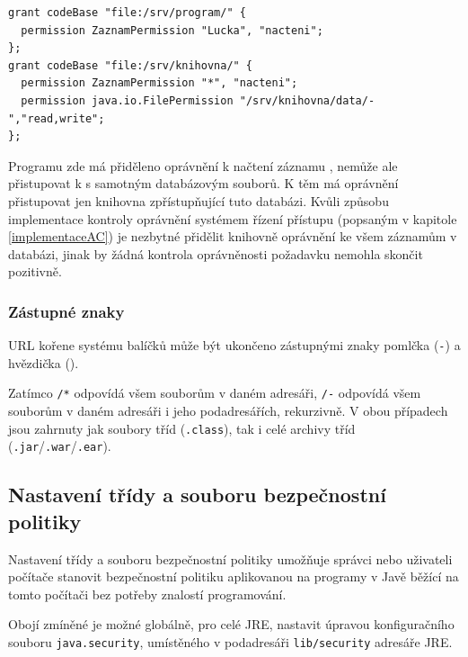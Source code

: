 \begin{lstlisting}[caption=Příklad souboru bezpečnostní politiky, label=prikladSouboruBP]
grant codeBase "file:/srv/program/" {
  permission ZaznamPermission "Lucka", "nacteni";
};
grant codeBase "file:/srv/knihovna/" {
  permission ZaznamPermission "*", "nacteni";
  permission java.io.FilePermission "/srv/knihovna/data/-","read,write";
};
\end{lstlisting}

Programu zde má přiděleno oprávnění k načtení záznamu , nemůže ale přistupovat k s samotným databázovým souborů. K těm má oprávnění přistupovat jen knihovna zpřístupňující tuto databázi. Kvůli způsobu implementace kontroly oprávnění systémem řízení přístupu (popsaným v kapitole \ref{implementaceAC}) je nezbytné přidělit knihovně oprávnění ke všem záznamům v databázi, jinak by žádná kontrola oprávněnosti požadavku nemohla skončit pozitivně.

\subsubsection{Zástupné znaky}

URL kořene systému balíčků může být ukončeno zástupnými znaky pomlčka ({\tt -}) a hvězdička ({\tt *}).

Zatímco {\tt /*} odpovídá všem souborům v daném adresáři, {\tt /-} odpovídá všem souborům v daném adresáři i jeho podadresářích, rekurzivně. V obou případech jsou zahrnuty jak soubory tříd ({\tt .class}), tak i celé archivy tříd ({\tt .jar}/{\tt .war}/{\tt .ear}).
\cite{jdkdocPolicyFiles}

\subsection{Nastavení třídy a souboru bezpečnostní politiky}\label{souborPolitiky}

Nastavení třídy a souboru bezpečnostní politiky umožňuje správci nebo uživateli počítače stanovit bezpečnostní politiku aplikovanou na programy v Javě běžící na tomto počítači bez potřeby znalostí programování.

Obojí zmíněné je možné globálně, pro celé JRE, nastavit úpravou konfiguračního souboru {\tt java.security}, umístěného v podadresáři {\tt lib/security} adresáře JRE. \cite{refPolicyFiles}

